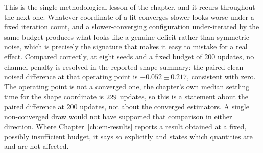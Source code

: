 \begin{remark}
\label{rmk:em-fixed-budget}
This is the single methodological lesson of the chapter, and it recurs
throughout the next one. Whatever coordinate of a fit converges slower looks
worse under a fixed iteration count, and a slower-converging configuration
under-iterated by the same budget produces what looks like a genuine deficit
rather than symmetric noise, which is precisely the signature that makes it
easy to mistake for a real effect. Compared correctly, at eight seeds and a
fixed budget of 200 updates, no channel penalty is resolved in the reported
shape summary: the paired clean $-$ noised difference at that operating point
is $-0.052\pm0.217$, consistent with zero. The operating point is not a
converged one, the chapter's own median settling time for the shape
coordinate is $229$ updates, so this is a statement about the
paired difference at $200$ updates, not about the converged estimators. A single non-converged draw would
not have supported that comparison in either direction. Where Chapter~\ref{ch:em-results}
reports a result obtained at a fixed, possibly insufficient budget, it says so
explicitly and states which quantities are and are not affected.
\end{remark}
